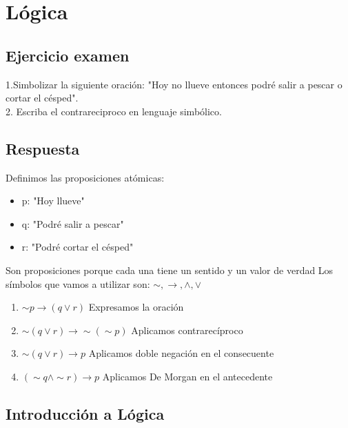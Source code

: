 \section{Lógica}

    \subsection{Ejercicio examen}

        1.Simbolizar la siguiente oración: "Hoy no llueve entonces podré salir a pescar o cortar el césped". \\
        2. Escriba el contrareciproco en lenguaje simbólico.
            
    \subsection{Respuesta}
    
        Definimos las proposiciones atómicas:
        
        \begin{itemize}
            \item p: "Hoy llueve"
            \item q: "Podré salir a pescar"
            \item r: "Podré cortar el césped"
        \end{itemize}
        Son proposiciones porque cada una tiene un sentido y un valor de verdad
        \newline
        Los símbolos que vamos a utilizar son: $\sim, \to, \wedge, \vee$
        
        
        \begin{enumerate}
            \item $\sim p \to (q \vee r )$ Expresamos la oración \newline
            \item $\sim (q \vee r ) \to \sim (\sim p)$  Aplicamos contrarecíproco \newline
            \item $\sim (q \vee r ) \to p $  Aplicamos doble negación en el consecuente \newline
            \item $(\sim q \wedge \sim r) \to p  $  Aplicamos De Morgan en el antecedente  \newline

        \end{enumerate}
    
    \subsection{Introducción a Lógica}
    

